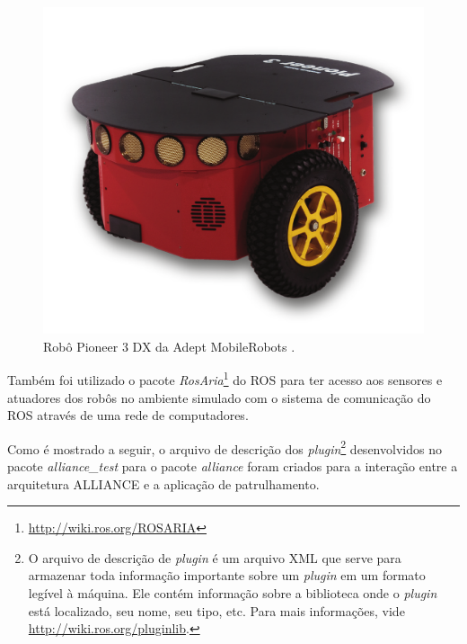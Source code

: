         \begin{figure}[htb]
            \centering
            \includegraphics[width=.5\textwidth]{Figuras/4_resultados/p3dx.png}
            \caption[Robô Pioneer 3 DX da Adept MobileRobots.]{Robô Pioneer 3 DX da Adept MobileRobots \cite{ref:adept2011p3dx}.}
            \label{fig:p3_dx}
        \end{figure}
        
        Também foi utilizado o pacote \textit{RosAria}\footnote{\url{http://wiki.ros.org/ROSARIA}} do ROS para ter acesso aos sensores e atuadores dos robôs no ambiente simulado com o sistema de comunicação do ROS através de uma rede de computadores. 
        
        Como é mostrado a seguir, o arquivo de descrição dos \textit{plugin}\footnote{O arquivo de descrição de \textit{plugin} é um arquivo XML que serve para armazenar toda informação importante sobre um \textit{plugin} em um formato legível à máquina. Ele contém informação sobre a biblioteca onde o \textit{plugin} está localizado, seu nome, seu tipo, etc. Para mais informações, vide \url{http://wiki.ros.org/pluginlib}.} desenvolvidos no pacote \textit{alliance\_test} para o pacote \textit{alliance} foram criados para a interação entre a arquitetura ALLIANCE e a aplicação de patrulhamento.
        
        

